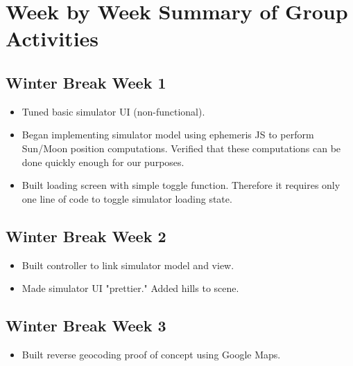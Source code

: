 \documentclass[10pt, onecolumn, draftclsnofoot, letterpaper, compsoc]{IEEEtran}
\begin{document}
\newpage
\section{Week by Week Summary of Group Activities}

\subsection{Winter Break Week 1}

    \begin{itemize}

    \item Tuned basic simulator UI (non-functional).

	\item Began implementing simulator model using ephemeris JS to perform Sun/Moon
		  position computations. Verified that these computations can be done
		  quickly enough for our purposes.

	\item Built loading screen with simple toggle function. Therefore it requires only
		  one line of code to toggle simulator loading state.

    \end{itemize}

\subsection{Winter Break Week 2}

    \begin{itemize}

    \item Built controller to link simulator model and view.

	\item Made simulator UI "prettier." Added hills to scene.

    \end{itemize}

\subsection{Winter Break Week 3}

    \begin{itemize}

    \item Built reverse geocoding proof of concept using Google Maps.

    \end{itemize}
\end{document}
